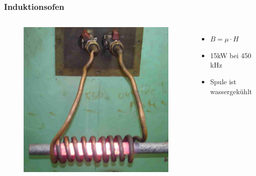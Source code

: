\begin{frame}
  \frametitle{Induktionsofen}
  \begin{columns}
    \begin{figure}
      \includegraphics[width=\textwidth,height=.7\textheight,keepaspectratio]{a08/Induction_heating_of_bar_crop.jpg}
    \end{figure}
    \begin{itemize}
      \item $B = \mu \cdot H$ %
      \item 15kW bei 450 kHz
      \item Spule ist wassergekühlt
    \end{itemize}
  \end{columns}
\end{frame}

